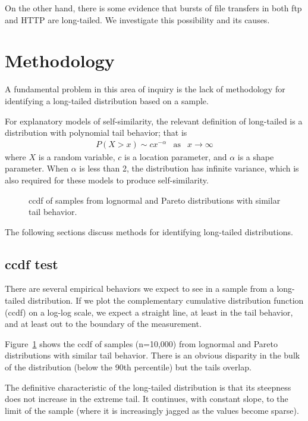 \documentclass[twocolumn,11pt]{infocom}
\begin{document}
On the other hand, there is some evidence that bursts of
file transfers in both ftp and HTTP are long-tailed.  We
investigate this possibility and its causes.

\section {Methodology}
\label{methodology}

A fundamental problem in this area of inquiry is the lack of
methodology for identifying a long-tailed distribution based on
a sample.

For explanatory models of self-similarity, the relevant definition of
long-tailed is a distribution with polynomial tail behavior; that is
%
\begin{eqnarray}
P(X > x) \sim c x^{-\alpha} & \mbox{as} & x \rightarrow \infty
\end{eqnarray}
%
where $X$ is a random variable, $c$ is a location parameter, and
$\alpha$ is a shape parameter.  When $\alpha$ is less than 2, the
distribution has infinite variance, which is
also required for these models to produce self-similarity.

\begin{figure}[tb]
\centerline{}
\caption{ccdf of samples from lognormal and Pareto distributions
with similar tail behavior.}
\label{fig.sample}
\end{figure}

The following sections discuss
methods for identifying long-tailed distributions.

\subsection {ccdf test}

There are several empirical behaviors we expect to see in a sample
from a long-tailed distribution.  If we plot the complementary cumulative
distribution function (ccdf) on a log-log scale, we
expect a straight line, at least in the tail behavior, and at
least out to the boundary of the measurement.

Figure~\ref{fig.sample} shows the ccdf of samples (n=10,000) from
lognormal and Pareto distributions with similar tail behavior.
There is an obvious disparity in the bulk of the distribution
(below the 90th percentile) but the tails overlap.

The definitive characteristic of the long-tailed distribution is that
its steepness does not increase in the extreme tail.  It continues,
with constant slope, to the limit of the sample (where it is
increasingly jagged as the values become sparse).
\end{document}

